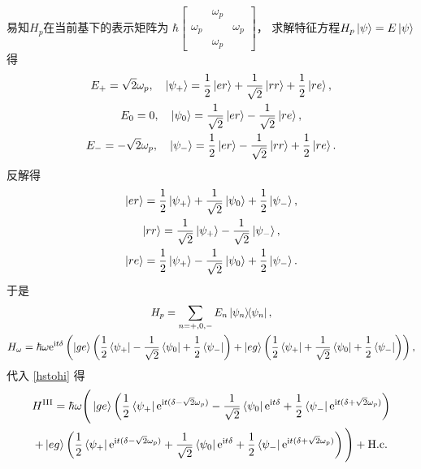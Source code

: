 \documentclass[
fontsetup = font-setup-open.tex,
titlesetup = titles-setup.tex
]{AJbook}
\numberwithin{equation}{section}
\begin{document}
易知$ H_p $在当前基下的表示矩阵为
$ \hbar\begin{bmatrix}
& \omega_p &          \\
\omega_p &          & \omega_p \\
& \omega_p &
\end{bmatrix} $，
求解特征方程$ H_p\ket{\psi}=E\ket{\psi} $得
\begin{equation}\label{key}
\begin{gathered}
E_+=\sqrt{2}\omega_p,\quad\ket{\psi_+}=\frac{1}{2}\ket{er}+\frac{1}{\sqrt{2}}\ket{rr}+\frac{1}{2}\ket{re},\\
E_0=0,\quad\ket{\psi_0}=\frac{1}{\sqrt{2}}\ket{er}-\frac{1}{\sqrt{2}}\ket{re},\\
E_-=-\sqrt{2}\omega_p,\quad\ket{\psi_-}=\frac{1}{2}\ket{er}-\frac{1}{\sqrt{2}}\ket{rr}+\frac{1}{2}\ket{re}.
\end{gathered}
\end{equation}
反解得
\begin{equation}\label{key}
\begin{gathered}
\ket{er}=\frac{1}{2}\ket{\psi_+}+\frac{1}{\sqrt{2}}\ket{\psi_0}+\frac{1}{2}\ket{\psi_-},\\
\ket{rr}=\frac{1}{\sqrt{2}}\ket{\psi_+}-\frac{1}{\sqrt{2}}\ket{\psi_-},\\
\ket{re}=\frac{1}{2}\ket{\psi_+}-\frac{1}{\sqrt{2}}\ket{\psi_0}+\frac{1}{2}\ket{\psi_-}.
\end{gathered}
\end{equation}
于是
\begin{equation}\label{key}
\begin{gathered}
H_p=\sum_{n=+,0,-}E_n\ketbra{\psi_n}{\psi_n},\\
H_\omega=\hbar\omega\mathrm{e}^{\mathrm{i}t \delta}\left(\ket{ge}\left(\frac{1}{2}\bra{\psi_+}-\frac{1}{\sqrt{2}}\bra{\psi_0}+\frac{1}{2}\bra{\psi_-}\right)+\ket{eg}\left(\frac{1}{2}\bra{\psi_+}+\frac{1}{\sqrt{2}}\bra{\psi_0}+\frac{1}{2}\bra{\psi_-}\right)\right),
\end{gathered}
\end{equation}
代入 \ref{hstohi} 得
\begin{multline}
H^{\mathrm{III}}=\hbar\omega\Bigg(\ket{ge}\left(\frac{1}{2}\bra{\psi_+}\mathrm{e}^{\mathrm{i}t(\delta-\sqrt{2}\omega_p)}-\frac{1}{\sqrt{2}}\bra{\psi_0}\mathrm{e}^{\mathrm{i}t \delta}+\frac{1}{2}\bra{\psi_-}\mathrm{e}^{\mathrm{i}t (\delta+\sqrt{2}\omega_p)}\right)\\
+\ket{eg}\left(\frac{1}{2}\bra{\psi_+}\mathrm{e}^{\mathrm{i}t(\delta-\sqrt{2}\omega_p)}+\frac{1}{\sqrt{2}}\bra{\psi_0}\mathrm{e}^{\mathrm{i}t \delta}+\frac{1}{2}\bra{\psi_-}\mathrm{e}^{\mathrm{i}t (\delta+\sqrt{2}\omega_p)}\right)\Bigg)+\mathrm{H.c.}
\end{multline}
\end{document}
